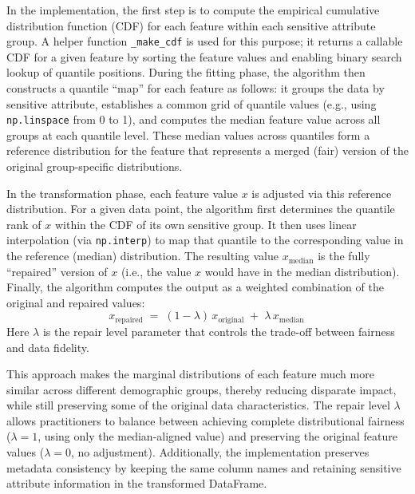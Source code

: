 \documentclass[12pt,a4paper,openright,twoside]{book}
\begin{document}
In the implementation, the first step is to compute the empirical cumulative distribution function (CDF) for each feature within each sensitive attribute group. A helper function \texttt{\_make\_cdf} is used for this purpose; it returns a callable CDF for a given feature by sorting the feature values and enabling binary search lookup of quantile positions. During the fitting phase, the algorithm then constructs a quantile “map” for each feature as follows: it groups the data by sensitive attribute, establishes a common grid of quantile values (e.g., using \texttt{np.linspace} from 0 to 1), and computes the median feature value across all groups at each quantile level. These median values across quantiles form a reference distribution for the feature that represents a merged (fair) version of the original group-specific distributions.

In the transformation phase, each feature value $x$ is adjusted via this reference distribution. For a given data point, the algorithm first determines the quantile rank of $x$ within the CDF of its own sensitive group. It then uses linear interpolation (via \texttt{np.interp}) to map that quantile to the corresponding value in the reference (median) distribution. The resulting value $x_{\text{median}}$ is the fully “repaired” version of $x$ (i.e., the value $x$ would have in the median distribution). Finally, the algorithm computes the output as a weighted combination of the original and repaired values: 
\[ 
x_{\text{repaired}} \;=\; (1 - \lambda)\,x_{\text{original}} \;+\; \lambda\,x_{\text{median}}\,
\] 
Here $\lambda$ is the repair level parameter that controls the trade-off between fairness and data fidelity.

This approach makes the marginal distributions of each feature much more similar across different demographic groups, thereby reducing disparate impact, while still preserving some of the original data characteristics. The repair level $\lambda$ allows practitioners to balance between achieving complete distributional fairness ($\lambda = 1$, using only the median-aligned value) and preserving the original feature values ($\lambda = 0$, no adjustment). Additionally, the implementation preserves metadata consistency by keeping the same column names and retaining sensitive attribute information in the transformed DataFrame.
\end{document}
